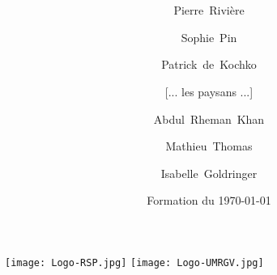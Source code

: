 


\graphicspath{{../../ressources/figures/}}



\title[Réseau Semences Paysannes] { \Large \titre \\ \large \formationB }

\author[P.Rivière]
{
\small %
\textcolor{mln-green}{Pierre~Rivière} \and
Sophie~Pin \and
Patrick~de~Kochko \and
[... les paysans ...] \and
Abdul~Rheman~Khan \and
Mathieu~Thomas \and
Isabelle~Goldringer
}


\date[\tiny V\versionFB~du \dateversionFB] { \small Formation du \today }

\titlegraphic
{
\texttt{[image: Logo-RSP.jpg]}
\hspace{1cm}
\texttt{[image: Logo-UMRGV.jpg]}
}



\maketitle


 

 





 

 





% 
%



